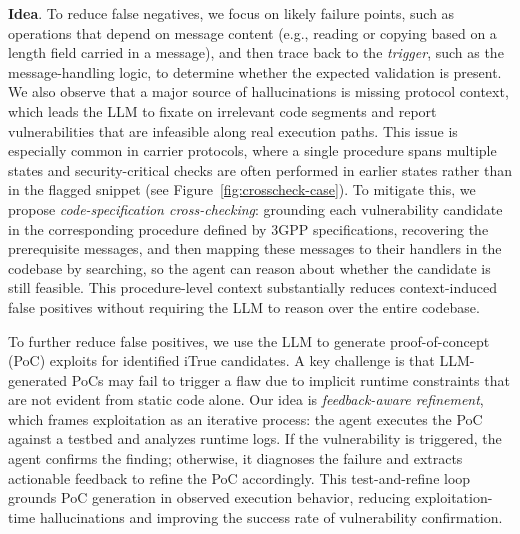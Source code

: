 \noindent\textbf{Idea}. To reduce false negatives, we focus on likely failure points, such as operations that depend on message content (e.g., reading or copying based on a length field carried in a message), and then trace back to the \textit{trigger}, such as the message-handling logic, to determine whether the expected validation is present. We also observe that a major source of hallucinations is missing protocol context, which leads the LLM to fixate on irrelevant code segments and report vulnerabilities that are infeasible along real execution paths. This issue is especially common in carrier protocols, where a single procedure spans multiple states and security-critical checks are often performed in earlier states rather than in the flagged snippet (see Figure~\ref{fig:crosscheck-case}). To mitigate this, we propose \textit{code-specification cross-checking}: grounding each vulnerability candidate in the corresponding procedure defined by 3GPP specifications, recovering the prerequisite messages, and then mapping these messages to their handlers in the codebase by searching, so the agent can reason about whether the candidate is still feasible. This procedure-level context substantially reduces context-induced false positives without requiring the LLM to reason over the entire codebase.

To further reduce false positives, we use the LLM to generate proof-of-concept (PoC) exploits for identified iTrue candidates. A key challenge is that LLM-generated PoCs may fail to trigger a flaw due to implicit runtime constraints that are not evident from static code alone. Our idea is \textit{feedback-aware refinement}, which frames exploitation as an iterative process: the agent executes the PoC against a testbed and analyzes runtime logs. If the vulnerability is triggered, the agent confirms the finding; otherwise, it diagnoses the failure and extracts actionable feedback to refine the PoC accordingly. This test-and-refine loop grounds PoC generation in observed execution behavior, reducing exploitation-time hallucinations and improving the success rate of vulnerability confirmation.

